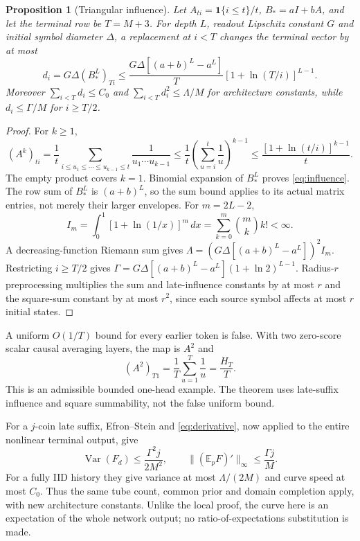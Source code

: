 \documentclass[11pt,letterpaper]{article}
\newtheorem{proposition}[theorem]{Proposition}
\theoremstyle{definition}\newtheorem{definition}[theorem]{Definition}
\theoremstyle{remark}\newtheorem{remark}[theorem]{Remark}
\newcommand{\E}{\mathbb{E}}
\newcommand{\ind}{\mathbf{1}}
\begin{document}
\begin{proposition}[Triangular influence]\label{prop:influence}
Let $A_{ti}=\ind\{i\le t\}/t$, $B_*=aI+bA$, and let the terminal row be $T=M+3$. For depth $L$, readout Lipschitz constant $G$ and initial symbol diameter $\Delta$, a replacement at $i<T$ changes the terminal vector by at most
\begin{equation}\label{eq:influence}
 d_i=G\Delta(B_*^L)_{Ti}
 \le\frac{G\Delta[(a+b)^L-a^L]}{T}
        [1+\ln(T/i)]^{L-1}.
\end{equation}
Moreover $\sum_{i<T}d_i\le C_0$ and $\sum_{i<T}d_i^2\le\Lambda/M$ for architecture constants, while $d_i\le\Gamma/M$ for $i\ge T/2$.
\end{proposition}
\begin{proof}
For $k\ge1$,
\[
 (A^k)_{ti}=\frac1t\sum_{i\le u_1\le\cdots\le u_{k-1}\le t}
 \frac1{u_1\cdots u_{k-1}}
 \le\frac1t\left(\sum_{u=i}^t\frac1u\right)^{k-1}
 \le\frac{[1+\ln(t/i)]^{k-1}}t.
\]
The empty product covers $k=1$. Binomial expansion of $B_*^L$ proves \eqref{eq:influence}. The row sum of $B_*^L$ is $(a+b)^L$, so the sum bound applies to its actual matrix entries, not merely their larger envelopes. For $m=2L-2$,
\[
 I_m=\int_0^1[1+\ln(1/x)]^m\,dx
     =\sum_{k=0}^m\binom m k k!<\infty.
\]
A decreasing-function Riemann sum gives $\Lambda=(G\Delta[(a+b)^L-a^L])^2I_m$. Restricting $i\ge T/2$ gives $\Gamma=G\Delta[(a+b)^L-a^L](1+\ln2)^{L-1}$. Radius-$r$ preprocessing multiplies the sum and late-influence constants by at most $r$ and the square-sum constant by at most $r^2$, since each source symbol affects at most $r$ initial states.
\end{proof}

A uniform $O(1/T)$ bound for every earlier token is false. With two zero-score scalar causal averaging layers, the map is $A^2$ and
\begin{equation}\label{eq:counterexample}
 (A^2)_{T1}=\frac1T\sum_{u=1}^T\frac1u=\frac{H_T}{T}.
\end{equation}
This is an admissible bounded one-head example. The theorem uses late-suffix influence and square summability, not the false uniform bound.

For a $j$-coin late suffix, Efron--Stein and \eqref{eq:derivative}, now applied to the entire nonlinear terminal output, give
\[
 \operatorname{Var}(F_d)\le\frac{\Gamma^2j}{2M^2},
 \qquad \| (\E_pF)'\|_\infty\le\frac{\Gamma j}{M}.
\]
For a fully IID history they give variance at most $\Lambda/(2M)$ and curve speed at most $C_0$. Thus the same tube count, common prior and domain completion apply, with new architecture constants. Unlike the local proof, the curve here is an expectation of the whole network output; no ratio-of-expectations substitution is made.
\end{document}
